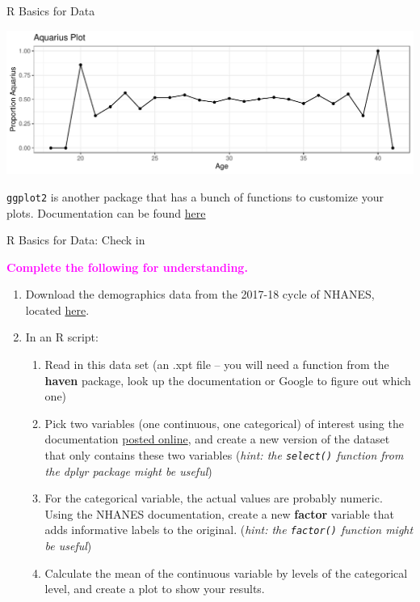\documentclass[svgnames,smaller]{beamer}\usepackage[]{graphicx}\usepackage[]{color}
\makeatletter
\def\maxwidth{ %
  \ifdim\Gin@nat@width>\linewidth
    \linewidth
  \else
    \Gin@nat@width
  \fi
}
\newenvironment{knitrout}{}{} %
\newcommand{\bmagenta}[1]{\textcolor{magenta}{\textbf{#1}}}
\makeatother
\begin{document}
\begin{frame}[fragile]{R Basics for Data}

\begin{knitrout}\scriptsize
{}\color{fgcolor}
\includegraphics[width=\maxwidth]{figure/unnamed-chunk-22-1} 
\end{knitrout}

\texttt{ggplot2} is another package that has a bunch of functions to customize your plots. Documentation can be found \href{https://ggplot2.tidyverse.org/index.html}{here}
\end{frame}



\begin{frame}[fragile]{R Basics for Data: Check in}

\bmagenta{Complete the following for understanding.} 
\begin{enumerate}
    \item Download the demographics data from the 2017-18 cycle of NHANES, located \href{https://wwwn.cdc.gov/nchs/nhanes/search/datapage.aspx?Component=Demographics&CycleBeginYear=2017}{here}.
    \item In an R script:
    \begin{enumerate}
        \item Read in this data set (an .xpt file -- you will need a function from the \textbf{haven} package, look up the documentation or Google to figure out which one)
        \item Pick two variables (one continuous, one categorical) of interest using the documentation \href{https://wwwn.cdc.gov/Nchs/Nhanes/2017-2018/DEMO_J.htm}{posted online}, and create a new version of the dataset that only contains these two variables (\textit{hint: the \texttt{select()} function from the dplyr package might be useful})
        \item For the categorical variable, the actual values are probably numeric. Using the NHANES documentation, create a new \textbf{factor} variable that adds informative labels to the original. (\textit{hint: the \texttt{factor()} function might be useful})
        \item Calculate the mean of the continuous variable by levels of the categorical level, and create a plot to show your results.
    \end{enumerate}
\end{enumerate}


\end{frame}
\end{document}
